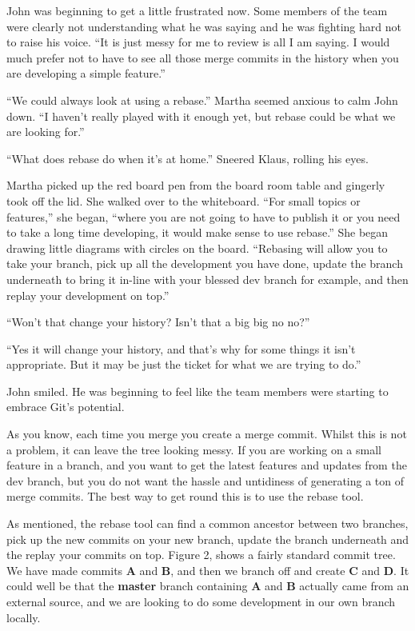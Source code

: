 \begin{trenches}
John was beginning to get a little frustrated now.
Some members of the team were clearly not understanding what he was saying and he was fighting hard not to raise his voice.
``It is just messy for me to review is all I am saying. I would much prefer not to have to see all those merge commits in the history when you are developing a simple feature.''

``We could always look at using a rebase.'' Martha seemed anxious to calm John down.
``I haven't really played with it enough yet, but rebase could be what we are looking for.''

``What does rebase do when it's at home.'' Sneered Klaus, rolling his eyes.

Martha picked up the red board pen from the board room table and gingerly took off the lid.
She walked over to the whiteboard.
``For small topics or features,'' she began,
``where you are not going to have to publish it or you need to take a long time developing, it would make sense to use rebase.''
She began drawing little diagrams with circles on the board.
``Rebasing will allow you to take your branch, pick up all the development you have done, update the branch underneath to bring it in-line with your blessed dev branch for example, and then replay your development on top.''

``Won't that change your history? Isn't that a big big no no?''

``Yes it will change your history, and that's why for some things it isn't appropriate. But it may be just the ticket for what we are trying to do.''

John smiled.
He was beginning to feel like the team members were starting to embrace Git's potential.
\end{trenches}

As you know, each time you merge you create a merge commit.
Whilst this is not a problem, it can leave the tree looking messy.
If you are working on a small feature in a branch, and you want to get the latest features and updates from the dev branch, but you do not want the hassle and untidiness of generating a ton of merge commits.
The best way to get round this is to use the rebase tool.

As mentioned, the rebase tool can find a common ancestor between two branches, pick up the new commits on your new branch, update the branch underneath and the replay your commits on top.
Figure 2, shows a fairly standard commit tree.
We have made commits \textbf{A} and \textbf{B}, and then we branch off and create \textbf{C} and \textbf{D}.
It could well be that the \textbf{master} branch containing \textbf{A} and \textbf{B} actually came from an external source, and we are looking to do some development in our own branch locally.


